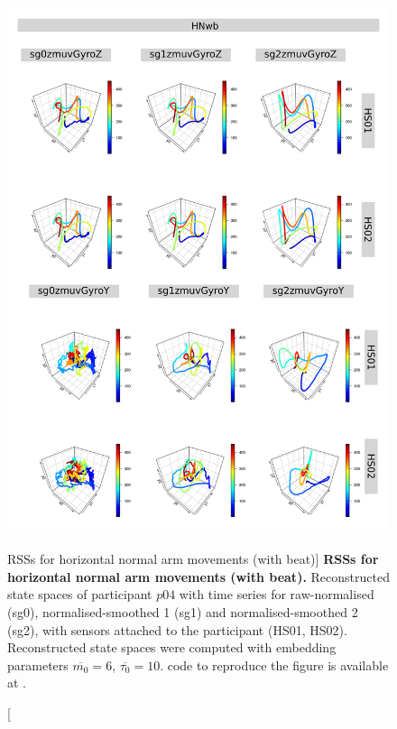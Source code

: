 \begin{figure}
\centering
\includegraphics[height=0.8\textheight]{rss_HNwb_p04}
\caption
	[RSSs for horizontal normal arm movements (with beat)]{
	{\bf RSSs for horizontal normal arm movements (with beat).}
	Reconstructed state spaces of participant $p04$
	with time series for raw-normalised (sg0), 
	normalised-smoothed 1 (sg1) and 
	normalised-smoothed 2 (sg2), 
	with sensors attached to the participant (HS01, HS02).
	Reconstructed state spaces were computed with 
	embedding parameters $\overline{m_0}=6$, $\overline{\tau_0}=10$.
		\R code to reproduce the figure is available at 
		.
        }
     \label{fig:rss_HNwb_p04}
\end{figure}






